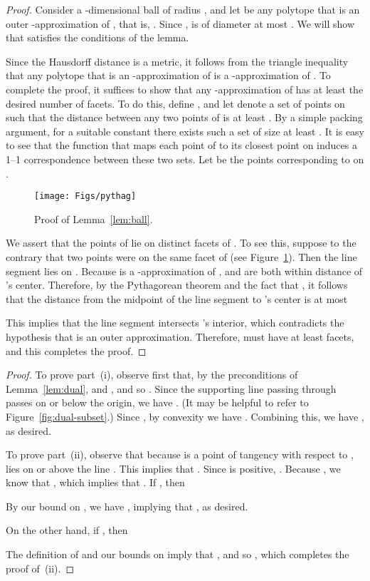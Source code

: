 \documentclass[11pt]{article}   \usepackage[letterpaper,hmargin=2.1cm,vmargin=3cm]{geometry}
\begin{document}
\begin{proof}
Consider a -dimensional ball  of radius , and let  be any polytope that is an outer -approximation of , that is, . Since ,  is of diameter at most . We will show that  satisfies the conditions of the lemma.

Since the Hausdorff distance is a metric, it follows from the triangle inequality that any polytope  that is an -approximation of  is a -approximation of . To complete the proof, it suffices to show that any -approximation of  has at least the desired number of facets. To do this, define , and let  denote a set of points on  such that the distance between any two points of  is at least . By a simple packing argument, for a suitable constant  there exists such a set of size at least . It is easy to see that the function that maps each point of  to its closest point on  induces a 1--1 correspondence between these two sets. Let  be the points corresponding to  on .

\begin{figure}[htbp]
	\centerline{\texttt{[image: Figs/pythag]}}
	\caption{Proof of Lemma~\ref{lem:ball}.}
	\label{fig:pythag}
\end{figure}


We assert that the points of  lie on distinct facets of . To see this, suppose to the contrary that two points  were on the same facet of  (see Figure~\ref{fig:pythag}). Then the line segment  lies on . Because  is a -approximation of ,  and  are both within distance  of 's center. Therefore, by the Pythagorean theorem and the fact that , it follows that the distance from the midpoint of the line segment  to 's center is at most


This implies that the line segment  intersects 's interior, which contradicts the hypothesis that  is an outer approximation. Therefore,  must have at least  facets, and this completes the proof.
\end{proof} 


{\DualSubsetHelperStmt*}


\begin{proof}
To prove part~(i), observe first that, by the preconditions of Lemma~\ref{lem:dual},  and , and so . Since the supporting line passing through  passes on or below the origin, we have . (It may be helpful to refer to Figure~\ref{fig:dual-subset}.) Since , by convexity we have . Combining this, we have , as desired.

To prove part~(ii), observe that because  is a point of tangency with respect to ,  lies on or above the line . This implies that . Since  is positive, . Because , we know that , which implies that . If , then

By our bound on , we have , implying that , as desired. 

On the other hand, if , then 

The definition of  and our bounds on  imply that , and so , which completes the proof of~(ii).
\end{proof}
\end{document}
